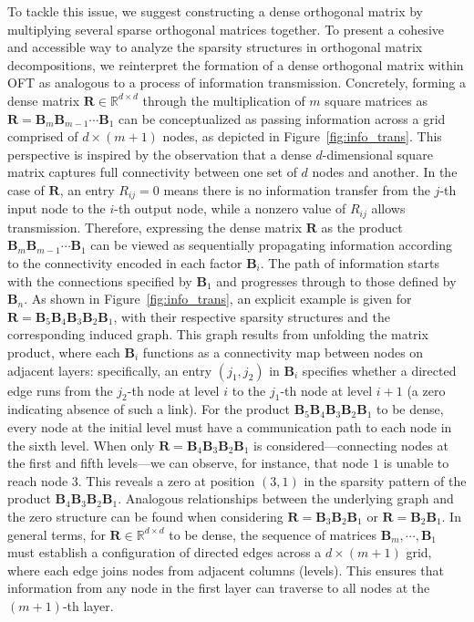To tackle this issue, we suggest constructing a dense orthogonal matrix by multiplying several sparse orthogonal matrices together. To present a cohesive and accessible way to analyze the sparsity structures in orthogonal matrix decompositions, we reinterpret the formation of a dense orthogonal matrix within OFT as analogous to a process of information transmission. Concretely, forming a dense matrix $\bm{R}\in\mathbb{R}^{d\times d}$ through the multiplication of $m$ square matrices as $\bm{R}=\bm{B}_m\bm{B}_{m-1}\cdots\bm{B}_1$ can be conceptualized as passing information across a grid comprised of $d\times (m+1)$ nodes, as depicted in Figure~\ref{fig:info_trans}. This perspective is inspired by the observation that a dense $d$-dimensional square matrix captures full connectivity between one set of $d$ nodes and another. In the case of $\bm{R}$, an entry $R_{ij}=0$ means there is no information transfer from the $j$-th input node to the $i$-th output node, while a nonzero value of $R_{ij}$ allows transmission. Therefore, expressing the dense matrix $\bm{R}$ as the product $\bm{B}_m\bm{B}_{m-1}\cdots\bm{B}_1$ can be viewed as sequentially propagating information according to the connectivity encoded in each factor $\bm{B}_i$. The path of information starts with the connections specified by $\bm{B}_1$ and progresses through to those defined by $\bm{B}_n$. As shown in Figure~\ref{fig:info_trans}, an explicit example is given for $\bm{R}=\bm{B}_5\bm{B}_4\bm{B}_3\bm{B}_2\bm{B}_1$, with their respective sparsity structures and the corresponding induced graph. This graph results from unfolding the matrix product, where each $\bm{B}_i$ functions as a connectivity map between nodes on adjacent layers: specifically, an entry $(j_1,j_2)$ in $\bm{B}_i$ specifies whether a directed edge runs from the $j_2$-th node at level $i$ to the $j_1$-th node at level $i+1$ (a zero indicating absence of such a link). For the product $\bm{B}_5\bm{B}_4\bm{B}_3\bm{B}_2\bm{B}_1$ to be dense, every node at the initial level must have a communication path to each node in the sixth level. When only $\bm{R}=\bm{B}_4\bm{B}_3\bm{B}_2\bm{B}_1$ is considered—connecting nodes at the first and fifth levels—we can observe, for instance, that node $1$ is unable to reach node $3$. This reveals a zero at position $(3,1)$ in the sparsity pattern of the product $\bm{B}_4\bm{B}_3\bm{B}_2\bm{B}_1$. Analogous relationships between the underlying graph and the zero structure can be found when considering $\bm{R}=\bm{B}_3\bm{B}_2\bm{B}_1$ or $\bm{R}=\bm{B}_2\bm{B}_1$. In general terms, for $\bm{R}\in\mathbb{R}^{d\times d}$ to be dense, the sequence of matrices $\bm{B}_m,\cdots,\bm{B}_1$ must establish a configuration of directed edges across a $d\times (m+1)$ grid, where each edge joins nodes from adjacent columns (levels). This ensures that information from any node in the first layer can traverse to all nodes at the $(m+1)$-th layer.


